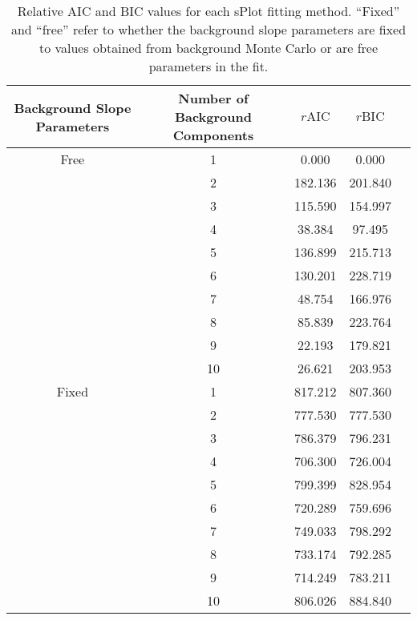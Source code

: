 \begin{table}[ht]
    \begin{center}
        \begin{tabular}{ccccc}\toprule
        Background Slope Parameters & Number of Background Components & $r\text{AIC}$ & $r\text{BIC}$\\\midrule
        Free & 1 & 0.000 & 0.000 \\
         & 2 & 182.136 & 201.840 \\
         & 3 & 115.590 & 154.997 \\
         & 4 & 38.384 & 97.495 \\
         & 5 & 136.899 & 215.713 \\
         & 6 & 130.201 & 228.719 \\
         & 7 & 48.754 & 166.976 \\
         & 8 & 85.839 & 223.764 \\
         & 9 & 22.193 & 179.821 \\
         & 10 & 26.621 & 203.953 \\
        Fixed & 1 & 817.212 & 807.360 \\
         & 2 & 777.530 & 777.530 \\
         & 3 & 786.379 & 796.231 \\
         & 4 & 706.300 & 726.004 \\
         & 5 & 799.399 & 828.954 \\
         & 6 & 720.289 & 759.696 \\
         & 7 & 749.033 & 798.292 \\
         & 8 & 733.174 & 792.285 \\
         & 9 & 714.249 & 783.211 \\
         & 10 & 806.026 & 884.840 \\\bottomrule
        \end{tabular}
        \caption{Relative AIC and BIC values for each sPlot fitting method. ``Fixed'' and ``free'' refer to whether the background slope parameters are fixed to values obtained from background Monte Carlo or are free parameters in the fit.}\label{tab:splot-model-results}
    \end{center}
\end{table}